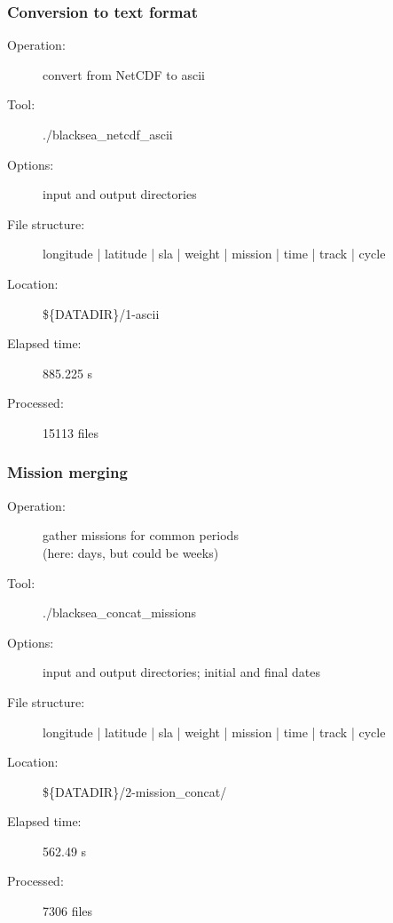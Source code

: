 
\begin{frame}
\frametitle{Conversion to text format}

\footnotesize
\begin{description}
\item[Operation:] convert from NetCDF to ascii  
\item[Tool:] ./blacksea\_netcdf\_ascii
\item[Options:] input and output directories
\item[File structure:] longitude | latitude | sla | weight | mission | time | track | cycle
\item[Location:] \$\{DATADIR\}/1-ascii 
\item[Elapsed time:]  885.225  s
\item[Processed:]  15113  files
\end{description}
\end{frame}


\begin{frame}
\frametitle{Mission merging}
\footnotesize
\begin{description}
\item[Operation:] gather missions for common periods\\
 (here: days, but could be weeks)
\item[Tool:] ./blacksea\_concat\_missions
\item[Options:] input and output directories; initial and final dates
\item[File structure:] longitude | latitude | sla | weight | mission | time | track | cycle
\item[Location:] \$\{DATADIR\}/2-mission\_concat/ 
\item[Elapsed time:]  562.49 s
\item[Processed:]  7306  files
\end{description}
\end{frame}

